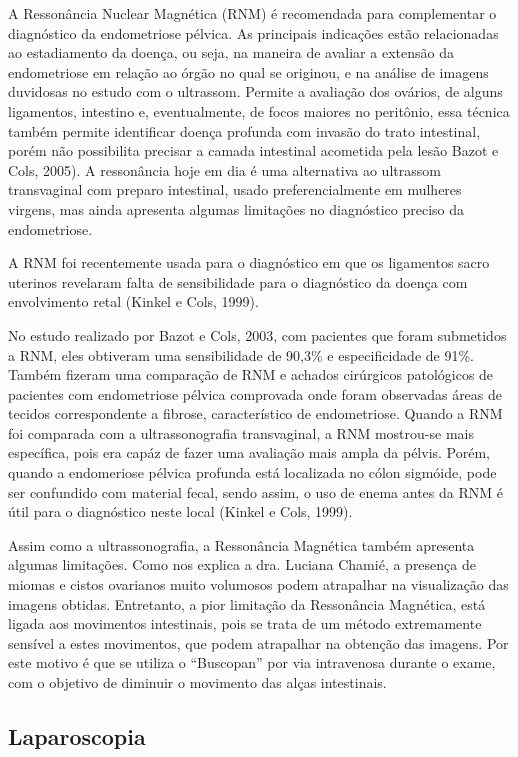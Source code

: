 \documentclass[12pt]{article} %
\begin{document}
A Ressonância Nuclear Magnética (RNM) é recomendada para complementar o diagnóstico da endometriose pélvica. As principais indicações estão relacionadas ao estadiamento da doença, ou seja, na maneira de avaliar a extensão da endometriose em relação ao órgão no qual se originou, e na análise de imagens duvidosas no estudo com o ultrassom. Permite a avaliação dos ovários, de alguns ligamentos, intestino e, eventualmente, de focos maiores no peritônio, essa técnica também permite identificar
doença profunda com invasão do trato intestinal, porém
não possibilita precisar a camada intestinal acometida pela
lesão Bazot e Cols, 2005). A ressonância hoje em dia é uma alternativa ao ultrassom transvaginal com preparo intestinal, usado preferencialmente em mulheres virgens, mas ainda apresenta algumas limitações no diagnóstico preciso da endometriose.


A RNM foi recentemente usada para o diagnóstico em que os ligamentos
sacro uterinos revelaram falta de sensibilidade para o diagnóstico da
doença com envolvimento retal (Kinkel e Cols, 1999). %

No estudo realizado por Bazot e Cols, 2003, com pacientes que foram
submetidos a RNM, eles obtiveram uma sensibilidade de 90,3\% e
especificidade de 91\%. Também fizeram uma comparação de RNM e
achados cirúrgicos patológicos de pacientes com endometriose pélvica
comprovada onde foram observadas áreas de tecidos correspondente a
fibrose, característico de endometriose. Quando a RNM foi comparada
com a ultrassonografia transvaginal, a RNM mostrou-se mais específica,
pois era capáz de fazer uma avaliação mais ampla da pélvis. Porém,
quando a endomeriose pélvica profunda está localizada no cólon
sigmóide, pode ser confundido com material fecal, sendo assim, o uso
de enema antes da RNM é útil para o diagnóstico neste local (Kinkel e
Cols, 1999).

Assim como a ultrassonografia, a Ressonância Magnética também apresenta algumas limitações. Como nos explica a dra. Luciana Chamié, a presença de miomas e cistos ovarianos muito volumosos podem atrapalhar na visualização das imagens obtidas. Entretanto, a pior limitação da Ressonância Magnética, está ligada aos movimentos intestinais, pois se trata de um método extremamente sensível a estes movimentos, que podem atrapalhar na obtenção das imagens. Por este motivo é que se utiliza o “Buscopan” por via intravenosa durante o exame, com o objetivo de diminuir o movimento das alças intestinais.


\subsection{Laparoscopia}
\end{document}
